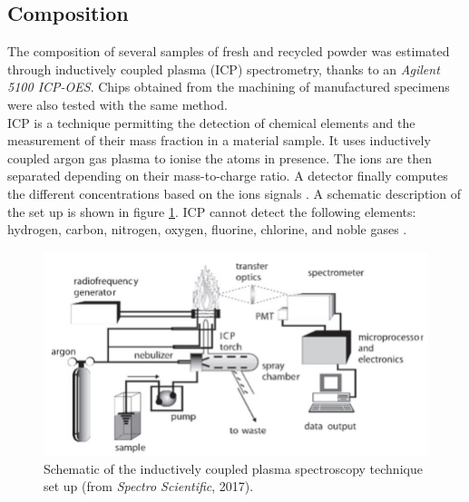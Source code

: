 \subsection{Composition}

The composition of several samples of fresh and recycled powder was estimated through inductively coupled plasma (ICP) spectrometry, thanks to an \textit{Agilent 5100 ICP-OES}. Chips obtained from the machining of manufactured specimens were also tested with the same method.\\

ICP is a technique permitting the detection of chemical elements and the measurement of their mass fraction in a material sample. It uses inductively coupled argon gas plasma to ionise the atoms in presence. The ions are then separated depending on their mass-to-charge ratio. A detector finally computes the different concentrations based on the ions signals \parencite{XRF}. A schematic description of the set up is shown in figure \ref{fig:ICP}. ICP cannot detect the following elements: hydrogen, carbon, nitrogen, oxygen, fluorine, chlorine, and noble gases \parencite{OHSU}.\\

\begin{figure}[ht]
\centering
\includegraphics[scale=0.6]{Images/ICP}
\decoRule
\caption[Schematic of the inductively coupled plasma spectroscopy technique set up.]{Schematic of the inductively coupled plasma spectroscopy technique set up (from \textit{Spectro Scientific}, 2017).}
\label{fig:ICP}
\end{figure}


